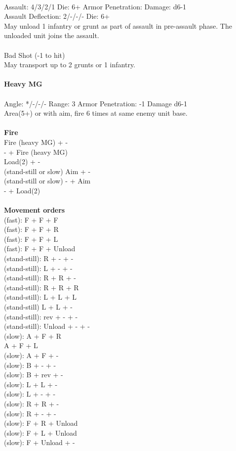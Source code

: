 \ \\
Assault: 4/3/2/1 Die: 6+ Armor Penetration:  Damage: d6-1 \\
Assault Deflection: 2/-/-/- Die: 6+\\
\indent May unload 1 infantry or grunt as part of assault in pre-assault phase. The unloaded unit joins the assault. \\
\ \\
Bad Shot (-1 to hit) \\ May transport up to 2 grunts or 1 infantry. 
\ \\
\ \\
{\bf Heavy MG } \\
\ \\
Angle: */-/-/- Range: 3 Armor Penetration: -1 Damage d6-1 \\
\indent Area(5+) or with aim, fire 6 times at same enemy unit base. \\





\ \\ {\bf Fire } \\
Fire (heavy MG) + - \\
- + Fire (heavy MG) \\
Load(2) + - \\
(stand-still or slow) Aim + - \\
(stand-still or slow) - + Aim \\
- + Load(2) \\
\ \\ {\bf Movement orders } \\
(fast): F + F + F \\
(fast): F + F + R \\
(fast): F + F + L \\
(fast): F + F + Unload \\
(stand-still): R + - + - \\
(stand-still): L + - + - \\
(stand-still): R + R + - \\
(stand-still): R + R + R \\
(stand-still): L + L + L \\
(stand-still) L + L + - \\
(stand-still): rev + - + - \\
(stand-still): Unload + - + - \\
(slow): A + F + R \\
A + F + L \\
(slow): A + F + - \\
(slow): B + - + - \\
(slow): B + rev + - \\
(slow): L + L + - \\
(slow): L + - + - \\
(slow): R + R + - \\
(slow): R + - + -  \\
(slow): F + R + Unload \\
(slow): F + L + Unload \\
(slow): F + Unload + - \\



